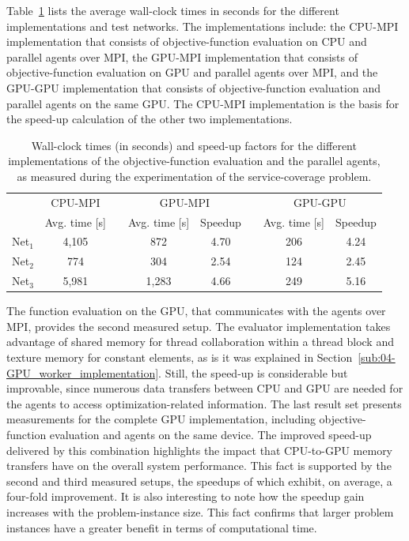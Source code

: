 Table~\ref{tab:06-Performance_analysis} lists the average wall-clock
times in seconds for the different implementations and test networks.
The implementations include: the CPU-MPI implementation that consists
of objective-function evaluation on CPU and parallel agents over MPI,
the GPU-MPI implementation that consists of objective-function evaluation
on GPU and parallel agents over MPI, and the GPU-GPU implementation
that consists of objective-function evaluation and parallel agents
on the same GPU. The CPU-MPI implementation is the basis for the speed-up
calculation of the other two implementations.

\begin{table}
\caption{Wall-clock times (in seconds) and speed-up factors for the different
implementations of the objective-function evaluation and the parallel
agents, as measured during the experimentation of the service-coverage
problem.\label{tab:06-Performance_analysis}}


\centering

\begin{tabular}{cccccccc}
\cmidrule{2-8} 
 & \multicolumn{1}{c}{CPU-MPI} &  & \multicolumn{2}{c}{GPU-MPI} &  & \multicolumn{2}{c}{GPU-GPU}\tabularnewline\addlinespace
\cmidrule{2-2} \cmidrule{4-5} \cmidrule{7-8} 
 & Avg. time {[}s{]} &  & Avg. time {[}s{]} & Speedup &  & Avg. time {[}s{]} & Speedup\tabularnewline\addlinespace
\cmidrule{1-2} \cmidrule{4-5} \cmidrule{7-8} 
Net$_{1}$ & 4,105 &  & 872 & 4.70 &  & 206 & 4.24\tabularnewline
Net$_{2}$ & 774 &  & 304 & 2.54 &  & 124 & 2.45\tabularnewline
Net$_{3}$ & 5,981 &  & 1,283 & 4.66 &  & 249 & 5.16\tabularnewline
\bottomrule
\end{tabular}
\end{table}


The function evaluation on the GPU, that communicates with the agents
over MPI, provides the second measured setup. The evaluator implementation
takes advantage of shared memory for thread collaboration within a
thread block and texture memory for constant elements, as is it was
explained in Section~\ref{sub:04-GPU_worker_implementation}. Still,
the speed-up is considerable but improvable, since numerous data transfers
between CPU and GPU are needed for the agents to access optimization-related
information. The last result set presents measurements for the complete
GPU implementation, including objective-function evaluation and agents
on the same device. The improved speed-up delivered by this combination
highlights the impact that CPU-to-GPU memory transfers have on the
overall system performance. This fact is supported by the second and
third measured setups, the speedups of which exhibit, on average,
a four-fold improvement. It is also interesting to note how the speedup
gain increases with the problem-instance size. This fact confirms
that larger problem instances have a greater benefit in terms of computational
time.


